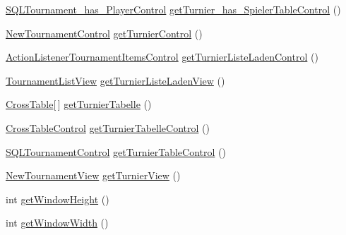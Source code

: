 \begin{DoxyCompactItemize}
\hyperlink{classde_1_1turnierverwaltung_1_1control_1_1_s_q_l_tournament__has___player_control}{S\+Q\+L\+Tournament\+\_\+has\+\_\+\+Player\+Control} \hyperlink{classde_1_1turnierverwaltung_1_1control_1_1_main_control_aeb426e1640ff55fef60b4cf191450892}{get\+Turnier\+\_\+has\+\_\+\+Spieler\+Table\+Control} ()
\item 
\hyperlink{classde_1_1turnierverwaltung_1_1control_1_1_new_tournament_control}{New\+Tournament\+Control} \hyperlink{classde_1_1turnierverwaltung_1_1control_1_1_main_control_ac23bdd77c5f188488c8db2788264b9ba}{get\+Turnier\+Control} ()
\item 
\hyperlink{classde_1_1turnierverwaltung_1_1control_1_1_action_listener_tournament_items_control}{Action\+Listener\+Tournament\+Items\+Control} \hyperlink{classde_1_1turnierverwaltung_1_1control_1_1_main_control_a168571f28260d4214c7eb0a1f7e9d35a}{get\+Turnier\+Liste\+Laden\+Control} ()
\item 
\hyperlink{classde_1_1turnierverwaltung_1_1view_1_1_tournament_list_view}{Tournament\+List\+View} \hyperlink{classde_1_1turnierverwaltung_1_1control_1_1_main_control_a20dd54feb3c560f9685f0de6996cab12}{get\+Turnier\+Liste\+Laden\+View} ()
\item 
\hyperlink{classde_1_1turnierverwaltung_1_1model_1_1_cross_table}{Cross\+Table}\mbox{[}$\,$\mbox{]} \hyperlink{classde_1_1turnierverwaltung_1_1control_1_1_main_control_a6fc339b13b651dbd12d6291a9230c8b8}{get\+Turnier\+Tabelle} ()
\item 
\hyperlink{classde_1_1turnierverwaltung_1_1control_1_1_cross_table_control}{Cross\+Table\+Control} \hyperlink{classde_1_1turnierverwaltung_1_1control_1_1_main_control_ac1c59f9033555d624b158194f3ebf277}{get\+Turnier\+Tabelle\+Control} ()
\item 
\hyperlink{classde_1_1turnierverwaltung_1_1control_1_1_s_q_l_tournament_control}{S\+Q\+L\+Tournament\+Control} \hyperlink{classde_1_1turnierverwaltung_1_1control_1_1_main_control_a8d7ad4f1e874cb117ceee92b25d79852}{get\+Turnier\+Table\+Control} ()
\item 
\hyperlink{classde_1_1turnierverwaltung_1_1view_1_1_new_tournament_view}{New\+Tournament\+View} \hyperlink{classde_1_1turnierverwaltung_1_1control_1_1_main_control_adfa3d3c355cb1ea622b58aae160f86cd}{get\+Turnier\+View} ()
\item 
int \hyperlink{classde_1_1turnierverwaltung_1_1control_1_1_main_control_a190ce25b045647d954cff32fa9b71995}{get\+Window\+Height} ()
\item 
int \hyperlink{classde_1_1turnierverwaltung_1_1control_1_1_main_control_a4134c88e7c9f0af86343d8728c94919d}{get\+Window\+Width} ()

\end{DoxyCompactItemize}
